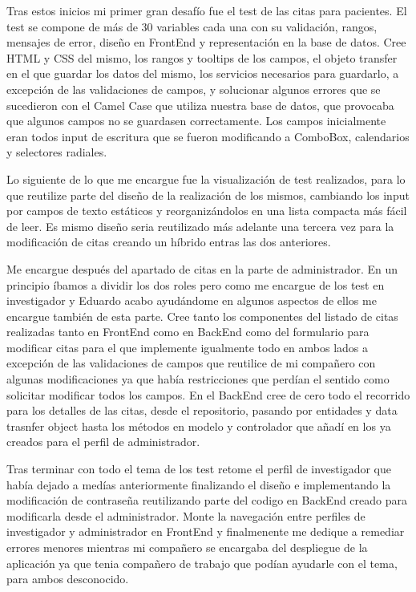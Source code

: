 Tras estos inicios mi primer gran desafío fue el test de las citas para pacientes. El test se compone de más de 30 variables cada una con su validación, rangos, mensajes de error, diseño en FrontEnd y representación en la base de datos. Cree HTML y CSS del mismo, los rangos y tooltips de los campos, el objeto transfer en el que guardar los datos del mismo, los servicios necesarios para guardarlo, a excepción de las validaciones de campos, y solucionar algunos errores que se sucedieron con el Camel Case que utiliza nuestra base de datos, que provocaba que algunos campos no se guardasen correctamente. Los campos inicialmente eran todos input de escritura que se fueron modificando a ComboBox, calendarios y selectores radiales.\newline

Lo siguiente de lo que me encargue fue la visualización de test realizados, para lo que reutilize parte del diseño de la realización de los mismos, cambiando los input por campos de texto estáticos y reorganizándolos en una lista compacta más fácil de leer. Es mismo diseño seria reutilizado más adelante una tercera vez para la modificación de citas creando un híbrido entras las dos anteriores.\newline

Me encargue después del apartado de citas en la parte de administrador. En un principio íbamos a dividir los dos roles pero como me encargue de los test en investigador y Eduardo acabo ayudándome en algunos aspectos de ellos me encargue también de esta parte. Cree tanto los componentes del listado de citas realizadas tanto en FrontEnd como en BackEnd como del formulario para modificar citas para el que implemente igualmente todo en ambos lados a excepción de las validaciones de campos que reutilice de mi compañero con algunas modificaciones ya que había restricciones que perdían el sentido como solicitar modificar todos los campos. En el BackEnd cree de cero todo el recorrido para los detalles de las citas, desde el repositorio, pasando por entidades y data trasnfer object hasta los métodos en modelo y controlador que añadí en los ya creados para el perfil de administrador.\newline

Tras terminar con todo el tema de los test retome el perfil de investigador que había dejado a medías anteriormente finalizando el diseño e implementando la modificación de contraseña reutilizando parte del codigo en BackEnd creado para modificarla desde el administrador. Monte la navegación entre perfiles de investigador y administrador en FrontEnd y finalmenente me dedique a remediar errores menores mientras mi compañero se encargaba del despliegue de la aplicación ya que tenia compañero de trabajo que podían ayudarle con el tema, para ambos desconocido.\newline

